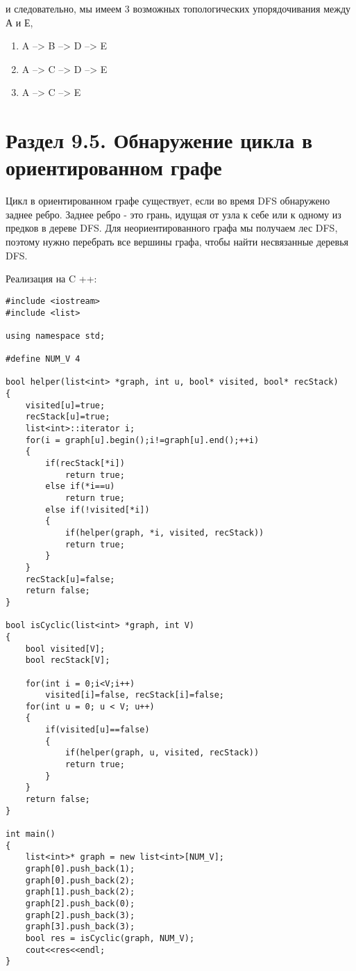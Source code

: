 и следовательно, мы имеем 3 возможных топологических упорядочивания между А и Е,

\begin{enumerate}
    \item A --> B --> D --> E
    \item A --> C --> D --> E
    \item A --> C --> E
\end{enumerate}

\section*{Раздел 9.5. Обнаружение цикла в ориентированном графе}

Цикл в ориентированном графе существует, если во время DFS обнаружено заднее ребро. Заднее ребро - это грань, идущая от узла к себе или к одному из предков в дереве DFS. Для неориентированного графа мы получаем лес DFS, поэтому нужно перебрать все вершины графа, чтобы найти несвязанные деревья DFS.

\vspace{\baselineskip}

Реализация на C ++:

\begin{tcolorbox}
\begin{verbatim}
#include <iostream>
#include <list>

using namespace std;

#define NUM_V 4

bool helper(list<int> *graph, int u, bool* visited, bool* recStack)
{
	visited[u]=true;
	recStack[u]=true;
	list<int>::iterator i;
	for(i = graph[u].begin();i!=graph[u].end();++i)
	{
		if(recStack[*i])
			return true;
		else if(*i==u)
			return true;
		else if(!visited[*i])
		{ 
			if(helper(graph, *i, visited, recStack))
			return true;
		}
	}
	recStack[u]=false;
	return false;
}

bool isCyclic(list<int> *graph, int V)
{
	bool visited[V];
	bool recStack[V];
	
	for(int i = 0;i<V;i++)
		visited[i]=false, recStack[i]=false;
	for(int u = 0; u < V; u++) 
	{ 
		if(visited[u]==false)
		{ 
			if(helper(graph, u, visited, recStack))
			return true;
		}
	}
	return false;
}

int main()
{
	list<int>* graph = new list<int>[NUM_V];
	graph[0].push_back(1);
	graph[0].push_back(2);
	graph[1].push_back(2);
	graph[2].push_back(0);
	graph[2].push_back(3);
	graph[3].push_back(3);
	bool res = isCyclic(graph, NUM_V);
	cout<<res<<endl;
}
\end{verbatim}
\end{tcolorbox}

